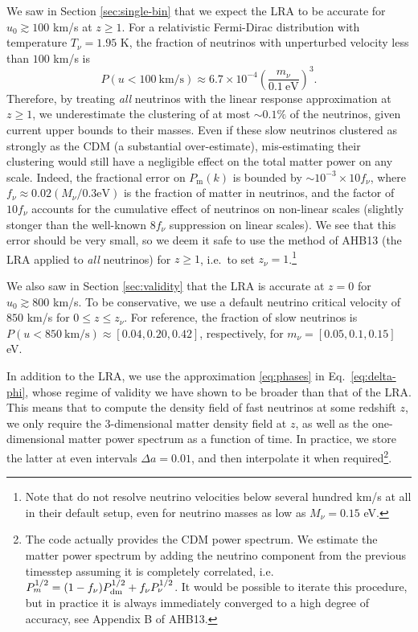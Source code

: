 \documentclass[useAMS, usenatbib]{mnras}
\newcommand{\beq}{\begin{equation}}
\newcommand{\eeq}{\end{equation}}
\begin{document}
We saw in Section \ref{sec:single-bin} that we expect the LRA to be accurate for $u_0 \gtrsim 100$ km/s at $z \geq 1$. For a relativistic Fermi-Dirac distribution with temperature $T_\nu = 1.95$ K, the fraction of neutrinos with unperturbed velocity less than $100$ km/s is
\beq
P(u < 100 ~\textrm{km/s}) \approx 6.7 \times 10^{-4} \left(\frac{m_{\nu}}{0.1~\textrm{eV}}\right)^3.
\eeq
Therefore, by treating \emph{all} neutrinos with the linear response approximation at $z \geq 1$, we underestimate the clustering of at most $\sim 0.1\%$ of the neutrinos, given current upper bounds to their masses.
Even if these slow neutrinos clustered as strongly as the CDM (a substantial over-estimate), mis-estimating their clustering would still have a negligible effect on the total matter power on any scale. Indeed, the fractional error on $P_\mathrm{m}(k)$ is bounded by $\sim 10^{-3} \times 10 f_{\nu}$, where $f_\nu \approx 0.02 (M_\nu/0.3 \textrm{eV})$ is the fraction of matter in neutrinos, and the factor of $10 f_\nu$ accounts for the cumulative effect of neutrinos on non-linear scales (slightly stonger than the well-known $8 f_\nu$ suppression on linear scales). We see that this error should be very small, so we deem it safe to use the method of AHB13 (the LRA applied to \emph{all} neutrinos) for $z \geq 1$, i.e.~to set $z_\nu = 1$.\footnote{Note that \cite{Banerjee_2018} do not resolve neutrino velocities below several hundred km/s at all in their default setup, even for neutrino masses as low as $M_\nu = 0.15$ eV.}

We also saw in Section \ref{sec:validity} that the LRA is accurate at $z = 0$ for $u_0 \gtrsim 800$ km/s. To be conservative, we use a default neutrino critical velocity of $850$ km/s for $0 \leq z \leq z_\nu$. For reference, the fraction of slow neutrinos is $P(u < 850 ~\textrm{km/s}) \approx [0.04, 0.20, 0.42]$, respectively, for  $m_{\nu} = [0.05, 0.1, 0.15]$ eV.

In addition to the LRA, we use the approximation \eqref{eq:phases} in Eq.~\eqref{eq:delta-phi}, whose regime of validity we have shown to be broader than that of the LRA. This means that to compute the density field of fast neutrinos at some redshift $z$, we only require the 3-dimensional matter density field at $z$, as well as the one-dimensional matter power spectrum as a function of time. In practice, we store the latter at even intervals $\Delta a = 0.01$, and then interpolate it when required\footnote{The code actually provides the CDM power spectrum. We estimate the matter power spectrum by adding the neutrino component from the previous timesstep assuming it is completely correlated, i.e. $P_m^{1/2} = (1 - f_\nu)P_{\rm dm}^{1/2} + f_\nu P_\nu^{1/2}$.
It would be possible to iterate this procedure, but in practice it is always immediately converged to a high degree of accuracy, see Appendix B of AHB13.}.
\end{document}
